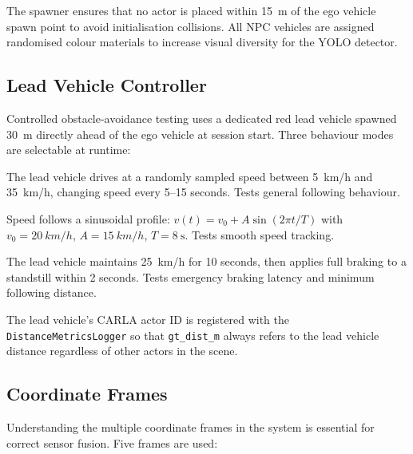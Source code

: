 \documentclass[12pt,a4paper]{article}
\begin{document}
\noindent
The spawner ensures that no actor is placed within \SI{15}{\metre} of the ego
vehicle spawn point to avoid initialisation collisions.  All NPC vehicles are
assigned randomised colour materials to increase visual diversity for the YOLO
detector.

\subsection{Lead Vehicle Controller}
\label{subsec:lead_vehicle}

Controlled obstacle-avoidance testing uses a dedicated red lead vehicle
spawned \SI{30}{\metre} directly ahead of the ego vehicle at session start.
Three behaviour modes are selectable at runtime:

\begin{description}[nosep, leftmargin=2em]
  \item[\texttt{Random}] The lead vehicle drives at a randomly sampled speed
        between \SI{5}{km/h} and \SI{35}{km/h}, changing speed every
        5--15 seconds.  Tests general following behaviour.
  \item[\texttt{Oscillate}] Speed follows a sinusoidal profile:
        $v(t) = v_0 + A\sin(2\pi t / T)$ with $v_0=\SI{20}{km/h}$,
        $A=\SI{15}{km/h}$, $T=\SI{8}{\second}$.  Tests smooth speed tracking.
  \item[\texttt{BrakeTest}] The lead vehicle maintains \SI{25}{km/h} for
        10 seconds, then applies full braking to a standstill within
        2 seconds.  Tests emergency braking latency and minimum following
        distance.
\end{description}

The lead vehicle's CARLA actor ID is registered with the
\texttt{DistanceMetricsLogger} so that \texttt{gt\_dist\_m} always refers to
the lead vehicle distance regardless of other actors in the scene.

\subsection{Coordinate Frames}
\label{subsec:coord_frames}

Understanding the multiple coordinate frames in the system is essential for
correct sensor fusion.  Five frames are used:
\end{document}
